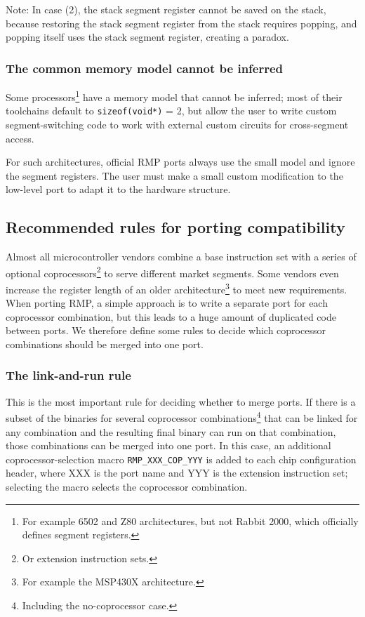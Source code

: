 Note: In case (2), the stack segment register cannot be saved on the stack, because restoring the stack segment register from the stack requires popping, and popping itself uses the stack segment register, creating a paradox.

\subsubsection{The common memory model cannot be inferred}

Some processors\footnote{For example 6502 and Z80 architectures, but not Rabbit 2000, which officially defines segment registers.} have a memory model that cannot be inferred; most of their toolchains default to \texttt{sizeof(void*)} = 2, but allow the user to write custom segment-switching code to work with external custom circuits for cross-segment access.

For such architectures, official RMP ports always use the small model and ignore the segment registers.
The user must make a small custom modification to the low-level port to adapt it to the hardware structure.

\subsection{Recommended rules for porting compatibility}

Almost all microcontroller vendors combine a base instruction set with a series of optional coprocessors\footnote{Or extension instruction sets.} to serve different market segments.
Some vendors even increase the register length of an older architecture\footnote{For example the MSP430X architecture.} to meet new requirements.
When porting RMP, a simple approach is to write a separate port for each coprocessor combination, but this leads to a huge amount of duplicated code between ports.
We therefore define some rules to decide which coprocessor combinations should be merged into one port.

\subsubsection{The link-and-run rule}

This is the most important rule for deciding whether to merge ports.
If there is a subset of the binaries for several coprocessor combinations\footnote{Including the no-coprocessor case.} that can be linked for any combination and the resulting final binary can run on that combination, those combinations can be merged into one port.
In this case, an additional coprocessor-selection macro \texttt{RMP\_XXX\_COP\_YYY} is added to each chip configuration header, where XXX is the port name and YYY is the extension instruction set; selecting the macro selects the coprocessor combination.


